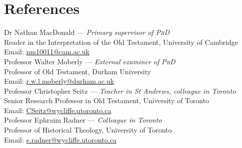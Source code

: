 \documentclass[11pt]{article}
\newcommand{\years}[1]{\marginnote{\footnotesize #1}}
\begin{document}

\section*{References}

Dr Nathan MacDonald --- \emph{Primary supervisor of \textsc{PhD}}\\
Reader in the Interpretation of the Old Testament, University of Cambridge\\
Email: \href{mailto:nm10011@cam.ac.uk}{nm10011@cam.ac.uk}\\

Professor Walter Moberly --- \emph{External examiner of \textsc{PhD}}\\
Professor of Old Testament, Durham University\\
Email: \href{mailto:r.w.l.moberly@durham.ac.uk}{r.w.l.moberly@durham.ac.uk}\\

Professor Christopher Seitz --- \emph{Teacher in St Andrews, colleague in Toronto}\\
Senior Research Professor in Old Testament, University of Toronto\\
Email: \href{mailto:CSeitz@wycliffe.utoronto.ca}{CSeitz@wycliffe.utoronto.ca}\\

Professor Ephraim Radner --- \emph{Colleague in Toronto}\\
Professor of Historical Theology, University of Toronto\\
Email: \href{mailto:e.radner@wycliffe.utoronto.ca}{e.radner@wycliffe.utoronto.ca}\\
\end{document}
